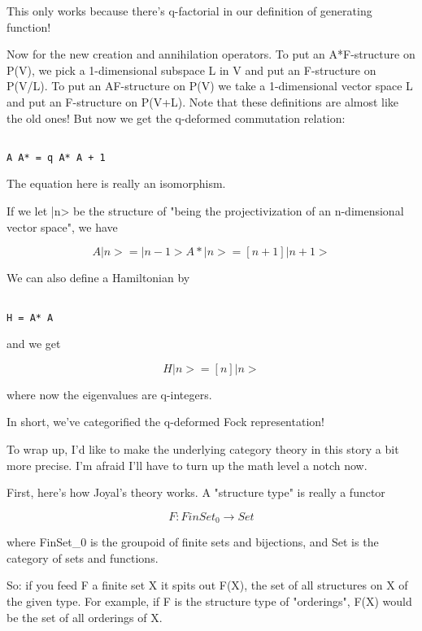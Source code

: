 This only works because there's q-factorial in our definition of
generating function!  

Now for the new creation and annihilation operators.  To put 
an A*F-structure on P(V), we pick a 1-dimensional subspace L in V
and put an F-structure on P(V/L).  To put an AF-structure on P(V)
we take a 1-dimensional vector space L and put an F-structure on
P(V+L).  Note that these definitions are almost like the old ones!
But now we get the q-deformed commutation relation:


\begin{verbatim}

A A* = q A* A + 1
\end{verbatim}
    
The equation here is really an isomorphism.   

If we let |n> be the structure of "being the projectivization of an
n-dimensional vector space", we have


$$

 A|n>  =        |n-1>
A*|n>  =  [n+1] |n+1>
$$
    
We can also define a Hamiltonian by


\begin{verbatim}

H = A* A
\end{verbatim}
    
and we get


$$

H|n> = [n] |n>
$$
    
where now the eigenvalues are q-integers.  

In short, we've categorified the q-deformed Fock representation!

To wrap up, I'd like to make the underlying category theory in this
story a bit more precise.   I'm afraid I'll have to turn up the math
level a notch now.

First, here's how Joyal's theory works.   A "structure type" is 
really a functor


$$

F: FinSet_{0} \to  Set
$$
    
where FinSet_{0} is the groupoid of finite sets and bijections,
and Set is the category of sets and functions.

So: if you feed F a finite set X it spits out F(X), the set of 
all structures on X of the given type.  For example, if F is the
structure type of "orderings", F(X) would be the set of all 
orderings of X.

